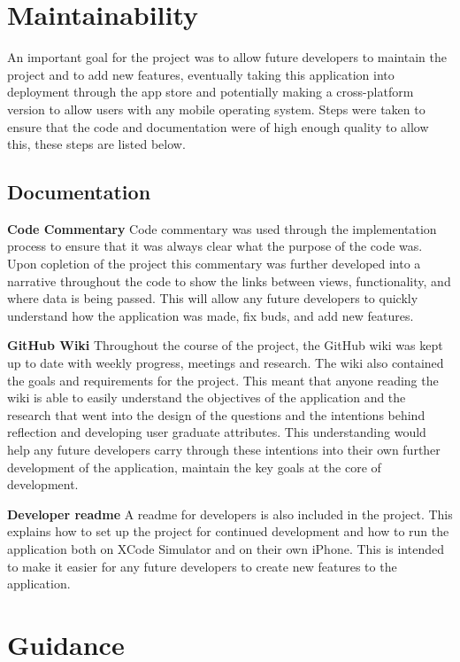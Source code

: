 \documentclass{l4proj}
\begin{document}
\section{Maintainability}
An important goal for the project was to allow future developers to maintain the project and to add new features, eventually taking this application into 
deployment through the app store and potentially making a cross-platform version to allow users with any mobile operating system. Steps were taken to ensure that 
the code and documentation were of high enough quality to allow this, these steps are listed below.

\subsection{Documentation}

\textbf{Code Commentary} Code commentary was used through the implementation process to ensure that it was always clear what the purpose of the code was. Upon
copletion of the project this commentary was further developed into a narrative throughout the code to show the links between views, functionality, and where
data is being passed. This will allow any future developers to quickly understand how the application was made, fix buds, and add new features.

\textbf{GitHub Wiki} Throughout the course of the project, the GitHub wiki was kept up to date with weekly progress, meetings and research. The wiki also 
contained the goals and requirements for the project. This meant that anyone reading the wiki is able to easily understand the objectives of the application
and the research that went into the design of the questions and the intentions behind reflection and developing user graduate attributes. This understanding
would help any future developers carry through these intentions into their own further development of the application, maintain the key goals at the core
of development. 

\textbf{Developer readme} A readme for developers is also included in the project. This explains how to set up the project for continued development and how
to run the application both on XCode Simulator and on their own iPhone. This is intended to make it easier for any future developers to create new features
to the application. 


\section{Guidance}
\end{document}
